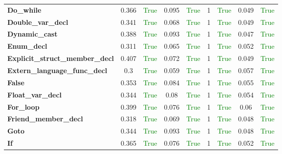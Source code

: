 \documentclass{article}
\begin{document}
\begin{xltabular}{\textwidth}{lcccccccc}
\textbf{{\fontsize{10}{12}\selectfont Do\_while}}& 0.366&\textcolor{green}{True}& 0.095&\textcolor{green}{True}& 1&\textcolor{green}{True}& 0.049&\textcolor{green}{True} \\[0.5ex]
\textbf{{\fontsize{10}{12}\selectfont Double\_var\_decl}}& 0.341&\textcolor{green}{True}& 0.068&\textcolor{green}{True}& 1&\textcolor{green}{True}& 0.049&\textcolor{green}{True} \\[0.5ex]
\textbf{{\fontsize{10}{12}\selectfont Dynamic\_cast}}& 0.388&\textcolor{green}{True}& 0.093&\textcolor{green}{True}& 1&\textcolor{green}{True}& 0.047&\textcolor{green}{True} \\[0.5ex]
\textbf{{\fontsize{10}{12}\selectfont Enum\_decl}}& 0.311&\textcolor{green}{True}& 0.065&\textcolor{green}{True}& 1&\textcolor{green}{True}& 0.052&\textcolor{green}{True} \\[0.5ex]
\textbf{{\fontsize{10}{12}\selectfont Explicit\_struct\_member\_decl}}& 0.407&\textcolor{green}{True}& 0.072&\textcolor{green}{True}& 1&\textcolor{green}{True}& 0.049&\textcolor{green}{True} \\[0.5ex]
\textbf{{\fontsize{10}{12}\selectfont Extern\_language\_func\_decl}}& 0.3&\textcolor{green}{True}& 0.059&\textcolor{green}{True}& 1&\textcolor{green}{True}& 0.057&\textcolor{green}{True} \\[0.5ex]
\textbf{{\fontsize{10}{12}\selectfont False}}& 0.353&\textcolor{green}{True}& 0.084&\textcolor{green}{True}& 1&\textcolor{green}{True}& 0.055&\textcolor{green}{True} \\[0.5ex]
\textbf{{\fontsize{10}{12}\selectfont Float\_var\_decl}}& 0.344&\textcolor{green}{True}& 0.08&\textcolor{green}{True}& 1&\textcolor{green}{True}& 0.054&\textcolor{green}{True} \\[0.5ex]
\textbf{{\fontsize{10}{12}\selectfont For\_loop}}& 0.399&\textcolor{green}{True}& 0.076&\textcolor{green}{True}& 1&\textcolor{green}{True}& 0.06&\textcolor{green}{True} \\[0.5ex]
\textbf{{\fontsize{10}{12}\selectfont Friend\_member\_decl}}& 0.318&\textcolor{green}{True}& 0.069&\textcolor{green}{True}& 1&\textcolor{green}{True}& 0.048&\textcolor{green}{True} \\[0.5ex]
\textbf{{\fontsize{10}{12}\selectfont Goto}}& 0.344&\textcolor{green}{True}& 0.093&\textcolor{green}{True}& 1&\textcolor{green}{True}& 0.048&\textcolor{green}{True} \\[0.5ex]
\textbf{{\fontsize{10}{12}\selectfont If}}& 0.365&\textcolor{green}{True}& 0.076&\textcolor{green}{True}& 1&\textcolor{green}{True}& 0.052&\textcolor{green}{True} \\[0.5ex]

\end{xltabular}
\end{document}
